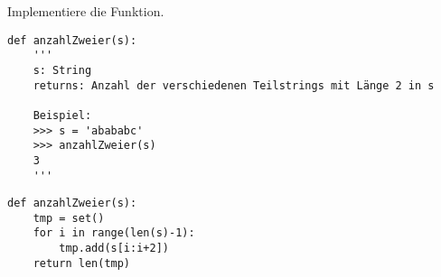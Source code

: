 \question[4] Implementiere die Funktion.
\begin{lstlisting}
def anzahlZweier(s):
    '''
    s: String
    returns: Anzahl der verschiedenen Teilstrings mit Länge 2 in s

    Beispiel:
    >>> s = 'abababc'
    >>> anzahlZweier(s)
    3
    '''
\end{lstlisting}
\begin{solutionbox}{6cm}
\begin{lstlisting}
def anzahlZweier(s):
    tmp = set()
    for i in range(len(s)-1):
        tmp.add(s[i:i+2])
    return len(tmp)

\end{lstlisting}
\end{solutionbox}
